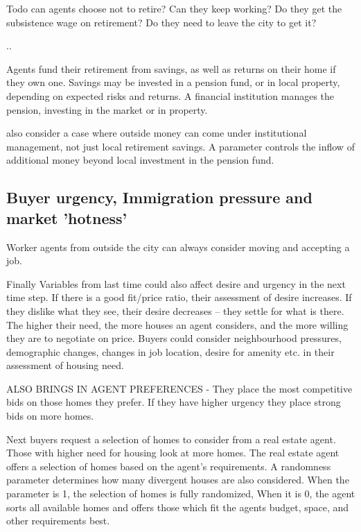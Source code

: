 Todo can agents choose not to retire? Can they keep working? Do they get the subsistence wage on retirement? Do they need to leave the city to get it? 

..

Agents fund their retirement from savings, as well as returns on their home if they own one. Savings may be invested in a pension fund, or in local property,  depending on expected risks and returns. %
A financial institution manages the pension, investing in the market or in property.

also consider a case where outside money can come under institutional management, not just local retirement savings. A parameter controls the inflow of additional money beyond local investment in the pension fund. 


\subsection{Buyer urgency, Immigration pressure and market 'hotness'} 
Worker agents from outside the city can always consider moving and accepting a job. %

Finally Variables from last time could also affect desire and urgency in the next time step. If there is a good fit/price ratio, their assessment of desire increases. If they dislike what they see, their desire decreases -- they settle for what is there. 
The higher their need, the more houses an agent considers, and the more willing they are to negotiate on price. %
Buyers could consider neighbourhood pressures, demographic changes, changes in job location, desire for amenity etc. in their assessment of housing need. 

ALSO BRINGS IN AGENT PREFERENCES - They place the most competitive bids on those homes they prefer. If they have higher urgency they place strong bids on more homes. 

Next buyers request a selection of homes to consider from a real estate agent. Those with higher need for housing look at more homes. The real estate agent offers a selection of homes based on the agent's requirements. A randomness parameter determines how many divergent houses are also considered. When the parameter is 1, the selection of homes is fully randomized, When it is 0, the agent sorts all available homes and offers those which fit the agents budget, space, and other requirements best.

